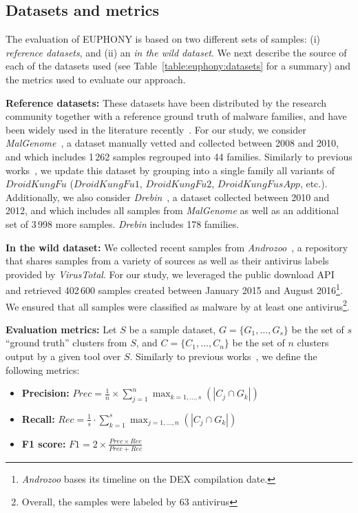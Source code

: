 \subsection{Datasets and metrics}
The evaluation of EUPHONY is based on two different sets of samples: (i) \textit{reference datasets}, and (ii) an \textit{in the wild dataset}.
We next describe the source of each of the datasets used (see Table~\ref{table:euphony:datasets} for a summary) and the metrics used to evaluate our approach.

\textbf{Reference datasets:} These datasets have been distributed by the research community together with a reference ground truth of malware families, and have been widely used in the literature recently~\cite{arp_drebin:_2014, dash_droidscribe:_2016,lindorfer_marvin:_2015}.
For our study, we consider {\em MalGenome}~\cite{zhou_dissecting_2012}, a dataset manually vetted and collected between 2008 and 2010, and which includes 1\,262 samples regrouped into 44 families.
Similarly to previous works~\cite{monrose_avclass:_2016}, we update this dataset by grouping into a single family all variants of $DroidKungFu$ ($DroidKungFu1$, $DroidKungFu2$, $DroidKungFusApp$, etc.).
Additionally, we also consider {\em Drebin}~\cite{arp_drebin:_2014}, a dataset collected between 2010 and 2012, and which includes all samples from {\em MalGenome} as well as an additional set of 3\,998 more samples.
{\em Drebin} includes 178 families.

\textbf{In the wild dataset:} We collected recent samples from {\em Androzoo}~\cite{allix_androzoo:_2016}, a repository that shares samples from a variety of sources as well as their antivirus labels provided by {\em VirusTotal}.
For our study, we leveraged the public download API and retrieved 402\,600 samples created between January 2015 and August 2016\footnote{{\em Androzoo} bases its timeline on the DEX compilation date.}.
We ensured that all samples were classified as malware by at least one antivirus\footnote{Overall, the samples were labeled by 63 antivirus}.



\textbf{Evaluation metrics:} Let $S$ be a sample dataset, $G = \{G_1, \dots, G_s\}$ be the set of $s$ ``ground truth'' clusters from $S$, and $C = \{C_1, \dots, C_n\}$ be the set of $n$ clusters output by a given tool over $S$.
Similarly to previous works~\cite{monrose_avclass:_2016}, we define the following metrics:

\begin{itemize}
	\item \textbf{Precision:} $Prec = \frac{1}{n} \times \sum^n_{j=1} \max_{k=1,\dots,s}(|C_j \cap G_k|)$
	\item \textbf{Recall:} $Rec = \frac{1}{s} \cdot \sum^s_{k=1} \max_{j=1,\dots,n}(|C_j \cap G_k|)$
	\item \textbf{F1 score:} $F1 = 2 \times \frac{Prec \times Rec}{Prec + Rec}$
\end{itemize}

